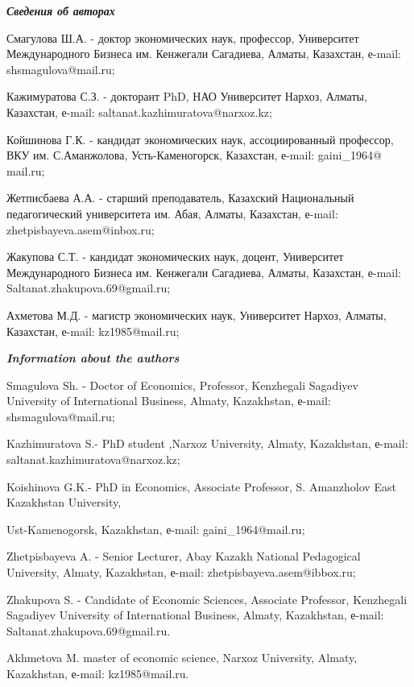 \begin{info}
\emph{{\bfseries Сведения об авторах}}

Смагулова Ш.А. - доктор экономических наук, профессор, Университет
Международного Бизнеса им. Кенжегали Сагадиева, Алматы, Казахстан,
е-mail: shsmagulova@mail.ru;

Кажимуратова С.З. - докторант PhD, НАО Университет Нархоз, Алматы,
Казахстан, е-mail: saltanat.kazhimuratova@narxoz.kz;

Койшинова Г.К. - кандидат экономических наук, ассоциированный
профессор, ВКУ им. С.Аманжолова, Усть-Каменогорск, Казахстан, е-mail:
gaini\_1964@ mail.ru;

Жетписбаева А.А. - старший преподаватель, Казахский Национальный
педагогический университета им. Абая, Алматы, Казахстан, е-mail:
zhetpisbayeva.asem@inbox.ru;

Жакупова С.Т. - кандидат экономических наук, доцент, Университет
Международного Бизнеса им. Кенжегали Сагадиева, Алматы, Казахстан,
е-mail: Saltanat.zhakupova.69@gmail.ru;

Ахметова М.Д. - магистр экономических наук, Университет Нархоз,
Алматы, Казахстан, е-mail: kz1985@mail.ru;

\emph{{\bfseries Information about the authors}}

Smagulova Sh. - Doctor of Economics, Professor, Kenzhegali Sagadiyev
University of International Business, Almaty, Kazakhstan, е-mail:
shsmagulova@mail.ru;

Kazhimuratova S.- PhD student ,Narxoz University, Almaty, Kazakhstan,
е-mail: saltanat.kazhimuratova@narxoz.kz;

Koishinova G.K.- PhD in Economics, Associate Professor, S. Amanzholov
East Kazakhstan University,

Ust-Kamenogorsk, Kazakhstan, е-mail: gaini\_1964@mail.ru;

Zhetpisbayeva A. - Senior Lecturer, Abay Kazakh National Pedagogical
University, Almaty, Kazakhstan, е-mail: zhetpisbayeva.asem@ibbox.ru;

Zhakupova S. - Candidate of Economic Sciences, Associate Professor,
Kenzhegali Sagadiyev University of International Business, Almaty,
Kazakhstan, е-mail: Saltanat.zhakupova.69@gmail.ru.

Akhmetova M. master of economic science, Narxoz University, Almaty,
Kazakhstan, е-mail: kz1985@mail.ru.
\end{info}
